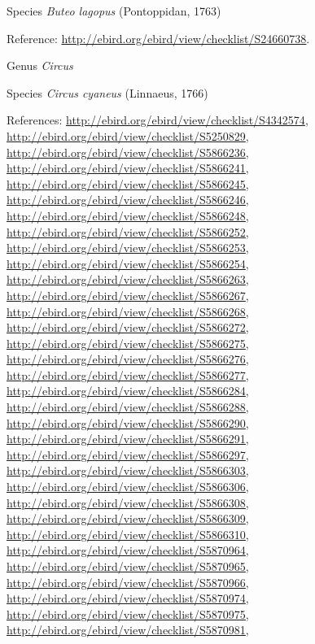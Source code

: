 \documentclass[9pt, article]{memoir}
\begin{document}
\begin{multicols}{2}
\vspace{6pt}\noindent\hspace{36pt}Species \textit{Buteo lagopus} (Pontoppidan, 1763)


\vspace{6pt}Reference: 
\url{http://ebird.org/ebird/view/checklist/S24660738}.

\vspace{6pt}\noindent\hspace{30pt}Genus \textit{Circus}


\vspace{6pt}\noindent\hspace{36pt}Species \textit{Circus cyaneus} (Linnaeus, 1766)


\vspace{6pt}References: 
\url{http://ebird.org/ebird/view/checklist/S4342574}, 
\url{http://ebird.org/ebird/view/checklist/S5250829}, 
\url{http://ebird.org/ebird/view/checklist/S5866236}, 
\url{http://ebird.org/ebird/view/checklist/S5866241}, 
\url{http://ebird.org/ebird/view/checklist/S5866245}, 
\url{http://ebird.org/ebird/view/checklist/S5866246}, 
\url{http://ebird.org/ebird/view/checklist/S5866248}, 
\url{http://ebird.org/ebird/view/checklist/S5866252}, 
\url{http://ebird.org/ebird/view/checklist/S5866253}, 
\url{http://ebird.org/ebird/view/checklist/S5866254}, 
\url{http://ebird.org/ebird/view/checklist/S5866263}, 
\url{http://ebird.org/ebird/view/checklist/S5866267}, 
\url{http://ebird.org/ebird/view/checklist/S5866268}, 
\url{http://ebird.org/ebird/view/checklist/S5866272}, 
\url{http://ebird.org/ebird/view/checklist/S5866275}, 
\url{http://ebird.org/ebird/view/checklist/S5866276}, 
\url{http://ebird.org/ebird/view/checklist/S5866277}, 
\url{http://ebird.org/ebird/view/checklist/S5866284}, 
\url{http://ebird.org/ebird/view/checklist/S5866288}, 
\url{http://ebird.org/ebird/view/checklist/S5866290}, 
\url{http://ebird.org/ebird/view/checklist/S5866291}, 
\url{http://ebird.org/ebird/view/checklist/S5866297}, 
\url{http://ebird.org/ebird/view/checklist/S5866303}, 
\url{http://ebird.org/ebird/view/checklist/S5866306}, 
\url{http://ebird.org/ebird/view/checklist/S5866308}, 
\url{http://ebird.org/ebird/view/checklist/S5866309}, 
\url{http://ebird.org/ebird/view/checklist/S5866310}, 
\url{http://ebird.org/ebird/view/checklist/S5870964}, 
\url{http://ebird.org/ebird/view/checklist/S5870965}, 
\url{http://ebird.org/ebird/view/checklist/S5870966}, 
\url{http://ebird.org/ebird/view/checklist/S5870974}, 
\url{http://ebird.org/ebird/view/checklist/S5870975}, 
\url{http://ebird.org/ebird/view/checklist/S5870981}, 

\end{multicols}
\end{document}
